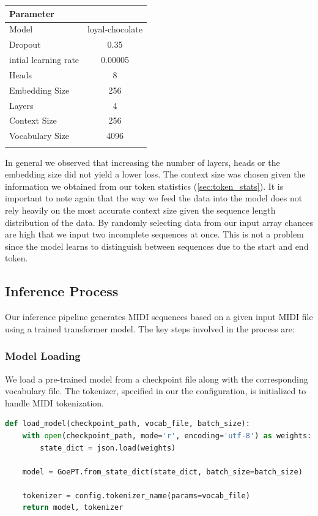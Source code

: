 \documentclass[a4paper,12pt]{extarticle}
\begin{document}
\begin{center}
    \begin{tabular}{lc}
  \toprule
  \textbf{Parameter} &  \\
  \midrule
  Model & loyal-chocolate \\
  Dropout & 0.35 \\
  intial learning rate & 0.00005 \\
  Heads  & 8 \\
  Embedding Size  & 256 \\
  Layers  & 4 \\
  Context Size & 256 \\
  Vocabulary Size & 4096 \\
  \bottomrule
  \label{tab:parameters}
\end{tabular}
\end{center}
In general we observed that increasing the number of layers, heads or the embedding size did not yield a lower loss.
The context size was chosen given the information we obtained from our token statistics (\ref{sec:token_stats}).
It is important to note again that the way we feed the data into the model does not rely heavily on the most accurate context size given the sequence length distribution of the data.
By randomly selecting data from our input array chances are high that we input two incomplete sequences at once. This is not a problem since the model learns to distinguish between sequences due to the start and end token.


\subsection{Inference Process}

Our inference pipeline generates MIDI sequences based on a given input MIDI file using a trained transformer model. The key steps involved in the process are:

\subsubsection{Model Loading}
We load a pre-trained model from a checkpoint file along with the corresponding vocabulary file. The tokenizer, specified in our the configuration, is initialized to handle MIDI tokenization.
\begin{lstlisting}[language=Python, caption=Loading the pre-trained model and tokenizer]
def load_model(checkpoint_path, vocab_file, batch_size):
    with open(checkpoint_path, mode='r', encoding='utf-8') as weights:
        state_dict = json.load(weights)

    model = GoePT.from_state_dict(state_dict, batch_size=batch_size)
    
    tokenizer = config.tokenizer_name(params=vocab_file)
    return model, tokenizer
\end{lstlisting}
\end{document}
